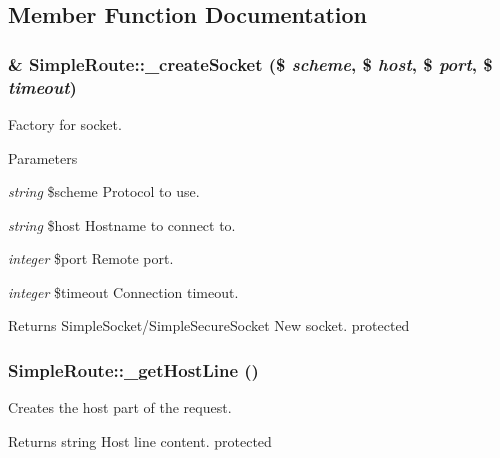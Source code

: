 \subsection{Member Function Documentation}
\hypertarget{class_simple_route_ad064d21e767491c8dd0e9a70ec2d1110}{
\subsubsection[{\_\-createSocket}]{\setlength{\rightskip}{0pt plus 5cm}\& SimpleRoute::\_\-createSocket (\$ {\em scheme}, \/  \$ {\em host}, \/  \$ {\em port}, \/  \$ {\em timeout})}}
\label{class_simple_route_ad064d21e767491c8dd0e9a70ec2d1110}
Factory for socket. 
\begin{DoxyParams}{Parameters}
\item[{\em string}]\$scheme Protocol to use. \item[{\em string}]\$host Hostname to connect to. \item[{\em integer}]\$port Remote port. \item[{\em integer}]\$timeout Connection timeout. \end{DoxyParams}
\begin{DoxyReturn}{Returns}
SimpleSocket/SimpleSecureSocket New socket.  protected 
\end{DoxyReturn}
\hypertarget{class_simple_route_af9b3205667c83b683a9636eaabc8f485}{
\subsubsection[{\_\-getHostLine}]{\setlength{\rightskip}{0pt plus 5cm}SimpleRoute::\_\-getHostLine ()}}
\label{class_simple_route_af9b3205667c83b683a9636eaabc8f485}
Creates the host part of the request. \begin{DoxyReturn}{Returns}
string Host line content.  protected 
\end{DoxyReturn}


